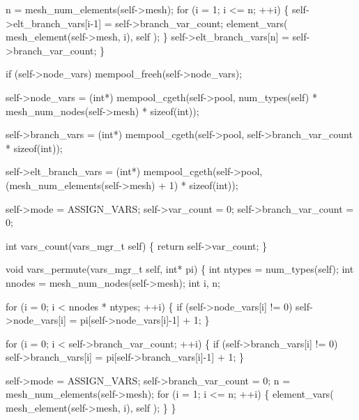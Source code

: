     n = mesh_num_elements(self->mesh);
    for (i = 1; i <= n; ++i) \{
        self->elt_branch_vars[i-1] = self->branch_var_count;
        element_vars( mesh_element(self->mesh, i), self );
    \}
    self->elt_branch_vars[n] = self->branch_var_count;
\}

\nwendcode{}\nwdocspar

\nwenddocs{}\endmoddef
if (self->node_vars)
     mempool_freeh(self->node_vars);

self->node_vars = 
(int*) mempool_cgeth(self->pool, num_types(self) * 
                     mesh_num_nodes(self->mesh) * sizeof(int));

self->branch_vars = 
(int*) mempool_cgeth(self->pool, self->branch_var_count * sizeof(int));

self->elt_branch_vars = 
(int*) mempool_cgeth(self->pool, (mesh_num_elements(self->mesh) + 1) * 
                     sizeof(int));

self->mode = ASSIGN_VARS;
self->var_count = 0;
self->branch_var_count = 0;

\nwendcode{}\nwdocspar

\nwenddocs{}\plusendmoddef
int vars_count(vars_mgr_t self)
\{
    return self->var_count;
\}

\nwendcode{}\nwdocspar

\nwenddocs{}\plusendmoddef
void vars_permute(vars_mgr_t self, int* pi)
\{
    int ntypes = num_types(self);
    int nnodes = mesh_num_nodes(self->mesh);
    int i, n;

    for (i = 0; i < nnodes * ntypes; ++i) \{
        if (self->node_vars[i] != 0)
            self->node_vars[i] = pi[self->node_vars[i]-1] + 1;
    \}

    for (i = 0; i < self->branch_var_count; ++i) \{
        if (self->branch_vars[i] != 0)
            self->branch_vars[i] = pi[self->branch_vars[i]-1] + 1;
    \}

    self->mode = ASSIGN_VARS;
    self->branch_var_count = 0;
    n = mesh_num_elements(self->mesh);
    for (i = 1; i <= n; ++i) \{
        element_vars( mesh_element(self->mesh, i), self );
    \}
\}

